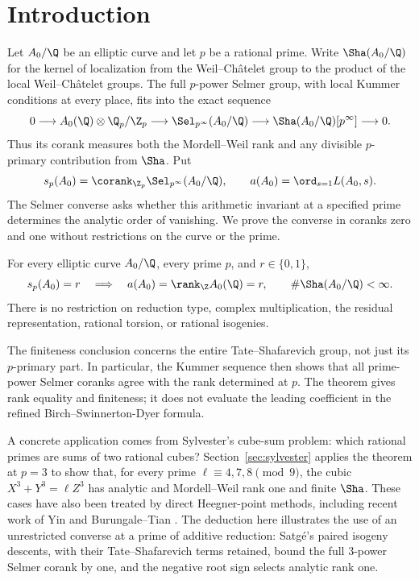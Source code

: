 \section{Introduction}\label{sec:introduction}

Let $A_0/\Q$ be an elliptic curve and let $p$ be a rational prime.
Write $\Sha(A_0/\Q)$ for the kernel of localization from the
Weil--Ch\^atelet group to the product of the local Weil--Ch\^atelet
groups. The full $p$-power Selmer group, with local Kummer conditions
at every place, fits into the exact sequence
\[
 0\longrightarrow A_0(\Q)\otimes\Q_p/\Z_p
 \longrightarrow\Sel_{p^\infty}(A_0/\Q)
 \longrightarrow\Sha(A_0/\Q)[p^\infty]
 \longrightarrow0.
\]
Thus its corank measures both the Mordell--Weil rank and any divisible
$p$-primary contribution from $\Sha$. Put
\[
 s_p(A_0)=\corank_{\Z_p}\Sel_{p^\infty}(A_0/\Q),
 \qquad a(A_0)=\ord_{s=1}L(A_0,s).
\]
The Selmer converse asks whether this arithmetic invariant at a
specified prime determines the analytic order of vanishing. We prove
the converse in coranks zero and one without restrictions on the curve
or the prime.

\begin{theorem}
\label{thm:main}
For every elliptic curve $A_0/\Q$, every prime $p$, and
$r\in\{0,1\}$,
\[
 s_p(A_0)=r
 \quad\Longrightarrow\quad
 a(A_0)=\rank_{\Z}A_0(\Q)=r,
 \qquad \#\Sha(A_0/\Q)<\infty.
\]
There is no restriction on reduction type, complex multiplication,
the residual representation, rational torsion, or rational isogenies.
\end{theorem}

The finiteness conclusion concerns the entire Tate--Shafarevich
group, not just its $p$-primary part. In particular, the Kummer sequence
then shows that all prime-power Selmer coranks agree with the rank
determined at $p$. The theorem gives rank equality and finiteness; it
does not evaluate the leading coefficient in the refined
Birch--Swinnerton-Dyer formula.

A concrete application comes from Sylvester's cube-sum problem:
which rational primes are sums of two rational cubes?
Section~\ref{sec:sylvester} applies the theorem at $p=3$ to show that,
for every prime $\ell\equiv4,7,8\pmod9$, the cubic
$X^3+Y^3=\ell Z^3$ has analytic and Mordell--Weil rank one and finite
$\Sha$. These cases have also been treated by direct Heegner-point
methods, including recent work of Yin and Burungale--Tian
\citep{Yin2026Sylvester47,Yin2026SylvesterGZ,BurungaleTian2026Sylvester}.
The deduction here illustrates the use of an unrestricted converse at
a prime of additive reduction: Satg\'e's paired isogeny descents,
with their Tate--Shafarevich terms retained, bound the full
$3$-power Selmer corank by one, and the negative root sign selects
analytic rank one.

